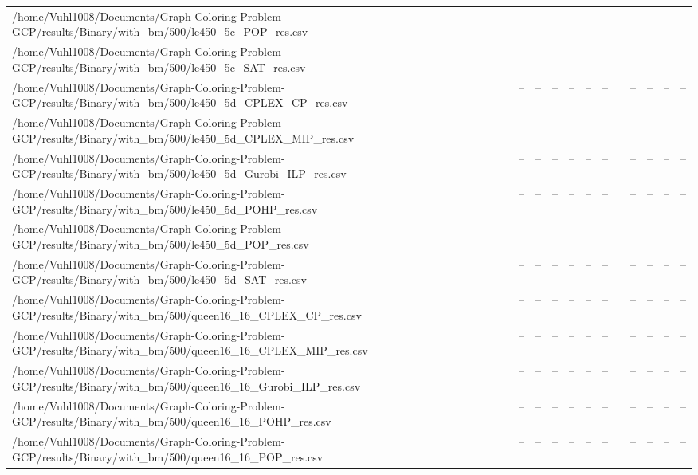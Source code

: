 \begin{table}[htbp]
\begin{tabular}{llllllllllll}
/home/Vuhl1008/Documents/Graph-Coloring-Problem-GCP/results/Binary/with\_bm/500/le450\_5c\_POP\_res.csv & -- & -- & -- & -- & -- & -- & {} & -- & -- & -- & -- \\
/home/Vuhl1008/Documents/Graph-Coloring-Problem-GCP/results/Binary/with\_bm/500/le450\_5c\_SAT\_res.csv & -- & -- & -- & -- & -- & -- & {} & -- & -- & -- & -- \\
/home/Vuhl1008/Documents/Graph-Coloring-Problem-GCP/results/Binary/with\_bm/500/le450\_5d\_CPLEX\_CP\_res.csv & -- & -- & -- & -- & -- & -- & {} & -- & -- & -- & -- \\
/home/Vuhl1008/Documents/Graph-Coloring-Problem-GCP/results/Binary/with\_bm/500/le450\_5d\_CPLEX\_MIP\_res.csv & -- & -- & -- & -- & -- & -- & {} & -- & -- & -- & -- \\
/home/Vuhl1008/Documents/Graph-Coloring-Problem-GCP/results/Binary/with\_bm/500/le450\_5d\_Gurobi\_ILP\_res.csv & -- & -- & -- & -- & -- & -- & {} & -- & -- & -- & -- \\
/home/Vuhl1008/Documents/Graph-Coloring-Problem-GCP/results/Binary/with\_bm/500/le450\_5d\_POHP\_res.csv & -- & -- & -- & -- & -- & -- & {} & -- & -- & -- & -- \\
/home/Vuhl1008/Documents/Graph-Coloring-Problem-GCP/results/Binary/with\_bm/500/le450\_5d\_POP\_res.csv & -- & -- & -- & -- & -- & -- & {} & -- & -- & -- & -- \\
/home/Vuhl1008/Documents/Graph-Coloring-Problem-GCP/results/Binary/with\_bm/500/le450\_5d\_SAT\_res.csv & -- & -- & -- & -- & -- & -- & {} & -- & -- & -- & -- \\
/home/Vuhl1008/Documents/Graph-Coloring-Problem-GCP/results/Binary/with\_bm/500/queen16\_16\_CPLEX\_CP\_res.csv & -- & -- & -- & -- & -- & -- & {} & -- & -- & -- & -- \\
/home/Vuhl1008/Documents/Graph-Coloring-Problem-GCP/results/Binary/with\_bm/500/queen16\_16\_CPLEX\_MIP\_res.csv & -- & -- & -- & -- & -- & -- & {} & -- & -- & -- & -- \\
/home/Vuhl1008/Documents/Graph-Coloring-Problem-GCP/results/Binary/with\_bm/500/queen16\_16\_Gurobi\_ILP\_res.csv & -- & -- & -- & -- & -- & -- & {} & -- & -- & -- & -- \\
/home/Vuhl1008/Documents/Graph-Coloring-Problem-GCP/results/Binary/with\_bm/500/queen16\_16\_POHP\_res.csv & -- & -- & -- & -- & -- & -- & {} & -- & -- & -- & -- \\
/home/Vuhl1008/Documents/Graph-Coloring-Problem-GCP/results/Binary/with\_bm/500/queen16\_16\_POP\_res.csv & -- & -- & -- & -- & -- & -- & {} & -- & -- & -- & -- \\

\end{tabular}
\end{table}
